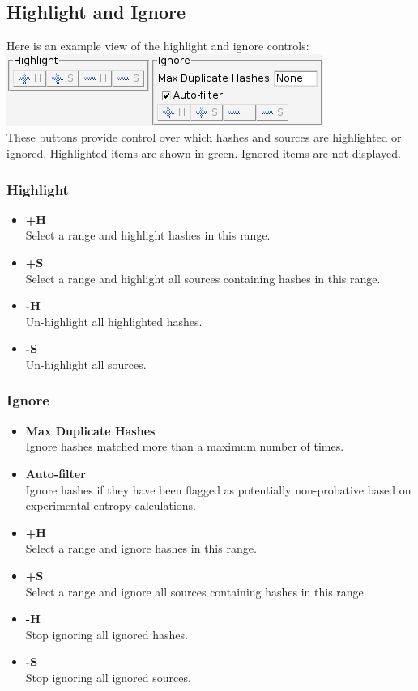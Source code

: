 \documentclass[11pt,fleqn]{article} %
\begin{document}
\subsection{Highlight and Ignore}
Here is an example view of the highlight and ignore controls:\\
\includegraphics[scale=.4]{screenshots/highlight_and_ignore}\\
These buttons provide control over which hashes and sources are highlighted or ignored. Highlighted items are shown in green. Ignored items are not displayed.
\subsubsection{Highlight}
\begin{itemize}
\item \textbf{+H}\\
Select a range and highlight hashes in this range.
\item \textbf{+S}\\
 Select a range and highlight all sources containing hashes in this range.
\item \textbf{-H}\\
Un-highlight all highlighted hashes.
\item \textbf{-S}\\
Un-highlight all sources.
\end{itemize}

\subsubsection{Ignore}
\begin{itemize}
\item \textbf{Max Duplicate Hashes}\\
Ignore hashes matched more than a maximum number of times.
\item \textbf{Auto-filter}\\
Ignore hashes if they have been flagged as potentially non-probative based on experimental entropy calculations.
\item \textbf{+H}\\
Select a range and ignore hashes in this range.
\item \textbf{+S}\\
Select a range and ignore all sources containing hashes in this range.
\item \textbf{-H}\\
Stop ignoring all ignored hashes.
\item \textbf{-S}\\
Stop ignoring all ignored sources.
\end{itemize}
\end{document}
